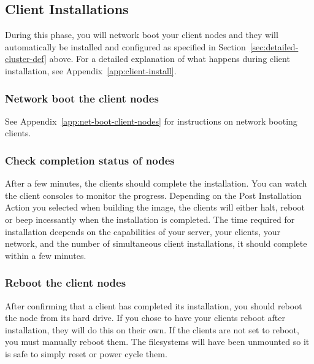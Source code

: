 
\subsection{Client Installations}

During this phase, you will network boot your client nodes and they
will automatically be installed and configured as specified in
Section~\ref{sec:detailed-cluster-def} above. For a detailed
explanation of what happens during client installation, see
Appendix~\ref{app:client-install}.

\subsubsection{Network boot the client nodes}

See Appendix~\ref{app:net-boot-client-nodes} for instructions on
network booting clients.

\subsubsection{Check completion status of nodes}

After a few minutes, the clients should complete the installation.
You can watch the client consoles to monitor the progress. Depending
on the Post Installation Action you selected when building the image,
the clients will either halt, reboot or beep incessantly when the 
installation is completed. 
The time required for installation deepends on the capabilities of
your server, your clients, your network, and the number of simultaneous 
client installations, it should complete within a few minutes.
  
\subsubsection{Reboot the client nodes}

After confirming that a client has completed its installation, you
should reboot the node from its hard drive. If you chose to have your
clients reboot after installation, they will do this on their
own. If the clients are not set to reboot, you must manually
reboot them. The filesystems will have been unmounted so it is safe
to simply reset or power cycle them.

